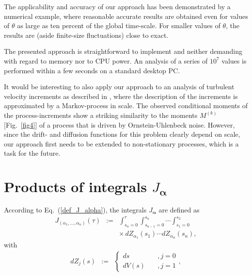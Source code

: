 \documentclass[aps,twocolumn,superscriptaddress,showpacs,showkeys]{revtex4}
\newcommand{\vecalpha}{{\boldsymbol{\alpha}}}
\begin{document}
The applicability and accuracy of our approach has been demonstrated by a numerical example, where reasonable accurate
results are obtained even for values of $\theta$ as large as ten percent of the global time-scale.
For smaller values of $\theta$, the results are (aside finite-size fluctuations) close to exact.

The presented approach is straightforward to implement and neither demanding with regard to memory nor to CPU power. An
analysis of a series of $10^7$ values is performed within a few seconds on a standard desktop PC.

It would be interesting to also apply our approach to an analysis of turbulent velocity increments as described in
\cite{friedrich97,renner01}, where the description of the increments is approximated by a Markov-process in scale. The observed
conditional moments of the process-increments show a striking similarity to the moments $M^{(k)}$ [Fig.~\ref{fig4}] of a
process that is driven by Ornstein-Uhlenbeck noise. However, since the drift- and diffusion functions for this problem
clearly depend on scale, our approach first needs to be extended to non-stationary processes, which is a task
for the future. 




\appendix
\section{Products of integrals $J_\vecalpha$}
\label{app_products_j_integrals}

\noindent According to Eq.~(\ref{def_J_alpha}), the integrals $J_\vecalpha$ are defined as
%
\begin{eqnarray}
J_{(\alpha_1,\ldots,\alpha_n)}(\tau) &:=&
\int_{s_n=0}^{\tau}
\int_{s_{n\!-\!1}=0}^{s_n}\!\cdots
\int_{s_1=0}^{s_2} \nonumber\\[.3em]
&&\times
\,dZ_{\alpha_1}(s_1)\cdots dZ_{\alpha_n}(s_n) ,
\end{eqnarray}
\noindent with
%
\begin{eqnarray}
dZ_j(s) &:=& \left\{\begin{array}{ll}
ds & \quad, j=0 \\
dV(s) & \quad, j=1
\end{array}\right. ,
\end{eqnarray}
\end{document}
